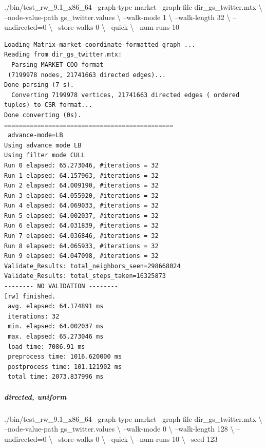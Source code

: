 \documentclass[10pt,oneside]{memoir}
\newenvironment{Shaded}{}{}
\newcommand{\ExtensionTok}[1]{#1}
\newcommand{\NormalTok}[1]{#1}
\let\oldsubparagraph\subparagraph
\renewcommand{\subparagraph}[1]{\oldsubparagraph{#1}\mbox{}}
\begin{document}
\begin{Shaded}
\begin{Highlighting}[]
\ExtensionTok{./bin/test_rw_9.1_x86_64}\NormalTok{ --graph-type market --graph-file dir_gs_twitter.mtx \textbackslash{}}
\NormalTok{    --node-value-path gs_twitter.values \textbackslash{}}
\NormalTok{    --walk-mode 1 \textbackslash{}}
\NormalTok{    --walk-length 32 \textbackslash{}}
\NormalTok{    --undirected=0 \textbackslash{}}
\NormalTok{    --store-walks 0 \textbackslash{}}
\NormalTok{    --quick \textbackslash{}}
\NormalTok{    --num-runs 10}
\end{Highlighting}
\end{Shaded}

\begin{verbatim}
Loading Matrix-market coordinate-formatted graph ...
Reading from dir_gs_twitter.mtx:
  Parsing MARKET COO format
 (7199978 nodes, 21741663 directed edges)...
Done parsing (7 s).
  Converting 7199978 vertices, 21741663 directed edges ( ordered tuples) to CSR format...
Done converting (0s).
==============================================
 advance-mode=LB
Using advance mode LB
Using filter mode CULL
Run 0 elapsed: 65.273046, #iterations = 32
Run 1 elapsed: 64.157963, #iterations = 32
Run 2 elapsed: 64.009190, #iterations = 32
Run 3 elapsed: 64.055920, #iterations = 32
Run 4 elapsed: 64.069033, #iterations = 32
Run 5 elapsed: 64.002037, #iterations = 32
Run 6 elapsed: 64.031839, #iterations = 32
Run 7 elapsed: 64.036846, #iterations = 32
Run 8 elapsed: 64.065933, #iterations = 32
Run 9 elapsed: 64.047098, #iterations = 32
Validate_Results: total_neighbors_seen=298668024
Validate_Results: total_steps_taken=16325873
-------- NO VALIDATION --------
[rw] finished.
 avg. elapsed: 64.174891 ms
 iterations: 32
 min. elapsed: 64.002037 ms
 max. elapsed: 65.273046 ms
 load time: 7086.91 ms
 preprocess time: 1016.620000 ms
 postprocess time: 101.121902 ms
 total time: 2073.837996 ms
\end{verbatim}

\hypertarget{directed-uniform}{%
\subparagraph{directed, uniform}\label{directed-uniform}}

\begin{Shaded}
\begin{Highlighting}[]
\ExtensionTok{./bin/test_rw_9.1_x86_64}\NormalTok{ --graph-type market --graph-file dir_gs_twitter.mtx \textbackslash{}}
\NormalTok{    --node-value-path gs_twitter.values \textbackslash{}}
\NormalTok{    --walk-mode 0 \textbackslash{}}
\NormalTok{    --walk-length 128 \textbackslash{}}
\NormalTok{    --undirected=0 \textbackslash{}}
\NormalTok{    --store-walks 0 \textbackslash{}}
\NormalTok{    --quick \textbackslash{}}
\NormalTok{    --num-runs 10 \textbackslash{}}
\NormalTok{    --seed 123}
\end{Highlighting}
\end{Shaded}
\end{document}
